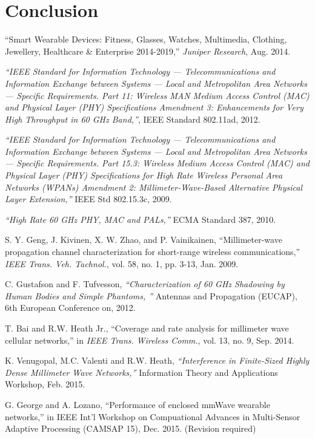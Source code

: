 \documentclass[10pt, conference, letterpaper]{IEEEtran}
\begin{document}
\section{Conclusion}

\begin{thebibliography}{50}
``Smart Wearable Devices: Fitness, Glasses, Watches, Multimedia, Clothing, Jewellery, Healthcare \& Enterprise 2014-2019,'' \emph{Juniper Research}, Aug. 2014.

\emph{``IEEE Standard for Information Technology — Telecommunications and Information Exchange between Systems — Local and Metropolitan Area Networks — Specific Requirements. Part 11: Wireless MAN Medium Access Control (MAC) and Physical Layer (PHY) Specifications Amendment 3: Enhancements for Very High Throughput in 60 GHz Band,''}, IEEE Standard 802.11ad, 2012.

\emph{``IEEE Standard for Information Technology — Telecommunications and Information Exchange between Systems — Local and Metropolitan Area Networks — Specific Requirements. Part 15.3: Wireless Medium Access Control (MAC) and Physical Layer (PHY) Specifications for High Rate Wireless Personal Area Networks (WPANs) Amendment 2: Millimeter-Wave-Based Alternative Physical Layer Extension,''} IEEE Std 802.15.3c, 2009.

\emph{``High Rate 60 GHz PHY, MAC and PALs,''} ECMA Standard 387, 2010.

S. Y. Geng, J. Kivinen, X. W. Zhao, and P. Vainikainen, ``Millimeter-wave propagation channel characterization for short-range wireless communications,'' \emph{IEEE Trans. Veh. Tachnol.}, vol. 58, no. 1, pp. 3-13, Jan. 2009.

C. Gustafson and F. Tufvesson, \emph{``Characterization of 60 GHz Shadowing by Human Bodies and Simple Phantoms, ''} Antennas and Propagation (EUCAP), 6th European Conference on, 2012.

T. Bai and R.W. Heath Jr., ``Coverage and rate analysis for millimeter wave cellular networks,'' in \emph{IEEE Trans. Wireless Comm.}, vol. 13, no. 9, Sep. 2014.

K. Venugopal, M.C. Valenti and R.W. Heath, \emph{``Interference in Finite-Sized Highly Dense Millimeter Wave Networks,''} Information Theory and Applications Workshop, Feb. 2015.

G. George and A. Lozano, ``Performance of enclosed mmWave wearable networks,'' in IEEE Int'l Workshop on Compuational Advances in Multi-Sensor Adaptive Processing (CAMSAP 15), Dec. 2015. (Revision required)


\end{thebibliography}
\end{document}
